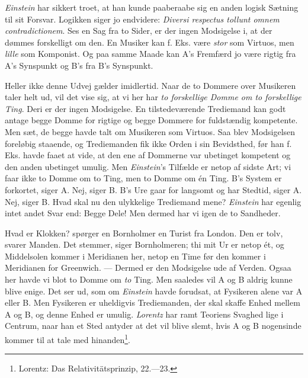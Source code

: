 \documentclass[12pt,a4paper]{article}
\newcommand{\opage}[1]{\marginnote{\footnotesize\textit{[#1]}}}
\begin{document}
\emph{Einstein} har sikkert troet, at han kunde paaberaabe sig en anden
logisk Sætning til sit Forsvar. Logikken siger jo endvidere:
\textit{Diversi respectus tollunt omnem contradictionem}. Ses en Sag fra to
Sider, er der ingen Modsigelse i, at der dømmes forskelligt om den. En
Musiker kan f. Eks. være \emph{stor} som Virtuos, men \emph{lille} som
\opage{16} Komponist. Og paa samme Maade kan A's Fremfærd jo være rigtig fra A's
Synspunkt og B's fra B's Synspunkt.

Heller ikke denne Udvej gælder imidlertid. Naar de to Dommere over
Musikeren taler helt ud, vil det vise sig, at vi her har \emph{to
forskellige Domme om to forskellige Ting}. Deri er der ingen Modsigelse. En
tilstedeværende Trediemand kan godt antage begge Domme for rigtige og begge
Dommere for fuldstændig kompetente. Men sæt, de begge havde talt om
Musikeren som Virtuos. Saa blev Modsigelsen foreløbig staaende, og
Trediemanden fik ikke Orden i sin Bevidsthed, før han f. Eks. havde faaet
at vide, at den ene af Dommerne var ubetinget kompetent og den anden
ubetinget umulig. Men \emph{Einstein}'s Tilfælde er netop af sidste Art; vi
faar ikke to Domme om to Ting, men to Domme om én Ting. B's System er
forkortet, siger A. Nej, siger B. B's Ure gaar for langsomt og har Stedtid,
siger A. Nej, siger B. Hvad skal nu den ulykkelige Trediemand mene?
\emph{Einstein} har egenlig intet andet Svar end: Begge Dele! Men dermed
har vi igen de to Sandheder.

Hvad er Klokken? spørger en Bornholmer en Turist fra London. Den er tolv,
svarer Manden. Det stemmer, siger Bornholmeren; thi mit Ur er netop ét, og
Middelsolen kommer i Meridianen her, netop en Time før den kommer i
Meridianen for Greenwich. --- Dermed er den Modsigelse ude af Verden.
Ogsaa her havde vi blot to Domme om \emph{to} Ting. Men saaledes vil A og B
aldrig kunne blive enige. Det ser ud, som om \emph{Einstein} havde
forudsat, at Fysikeren alene var A eller B. Men Fysikeren er uheldigvis
Trediemanden, der skal skaffe Enhed mellem A og B, og denne Enhed er
umulig. \emph{Lorentz} har ramt Teoriens Svaghed lige i Centrum, naar han
et Sted antyder at det vil blive slemt, hvis A og B nogensinde kommer til
at tale med hinanden\footnote{Lorentz: Das Relativitätsprinzip,
22.---23.}.
\end{document}
